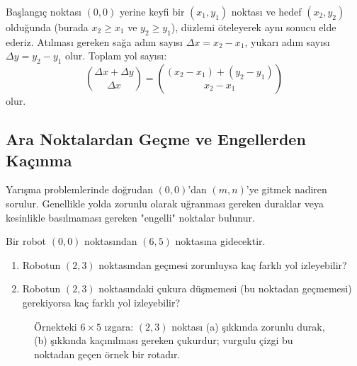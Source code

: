 Başlangıç noktası $(0,0)$ yerine keyfi bir $(x_1, y_1)$ noktası ve hedef $(x_2, y_2)$ olduğunda (burada $x_2 \ge x_1$ ve $y_2 \ge y_1$), düzlemi öteleyerek aynı sonucu elde ederiz. Atılması gereken sağa adım sayısı $\Delta x = x_2 - x_1$, yukarı adım sayısı $\Delta y = y_2 - y_1$ olur. Toplam yol sayısı:
\[
\binom{\Delta x + \Delta y}{\Delta x} = \binom{(x_2 - x_1) + (y_2 - y_1)}{x_2 - x_1}
\]
olur.

\subsection{Ara Noktalardan Geçme ve Engellerden Kaçınma}

Yarışma problemlerinde doğrudan $(0,0)$'dan $(m,n)$'ye gitmek nadiren sorulur. Genellikle yolda zorunlu olarak uğranması gereken duraklar veya kesinlikle basılmaması gereken "engelli" noktalar bulunur.

\begin{example}
Bir robot $(0,0)$ noktasından $(6,5)$ noktasına gidecektir.
\begin{enumerate}
    \item[a)] Robotun $(2,3)$ noktasından geçmesi zorunluysa kaç farklı yol izleyebilir?
    \item[b)] Robotun $(2,3)$ noktasındaki çukura düşmemesi (bu noktadan geçmemesi) gerekiyorsa kaç farklı yol izleyebilir?
\end{enumerate}
\end{example}

\begin{figure}[ht]
\centering
{}
\caption{Örnekteki $6 \times 5$ ızgara: $(2,3)$ noktası (a) şıkkında zorunlu durak,
(b) şıkkında kaçınılması gereken çukurdur; vurgulu çizgi bu noktadan geçen örnek
bir rotadır.}
\end{figure}

